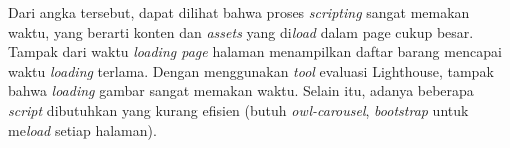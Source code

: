 Dari angka tersebut, dapat dilihat bahwa proses \textit{scripting} sangat memakan waktu, yang berarti konten dan \textit{assets} yang di\textit{load} dalam page cukup besar. Tampak dari waktu \textit{loading page} halaman menampilkan daftar barang mencapai waktu \textit{loading} terlama. Dengan menggunakan \textit{tool} evaluasi Lighthouse, tampak bahwa \textit{loading} gambar sangat memakan waktu. Selain itu, adanya beberapa \textit{script} dibutuhkan yang kurang efisien (butuh \textit{owl-carousel}, \textit{bootstrap} untuk me\textit{load} setiap halaman). \\